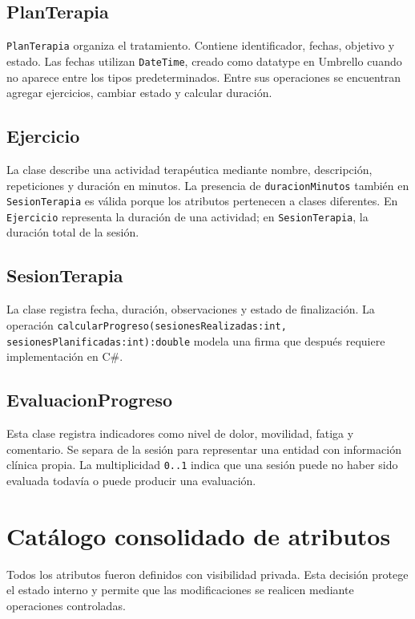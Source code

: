 \subsection{PlanTerapia}
\texttt{PlanTerapia} organiza el tratamiento. Contiene identificador, fechas, objetivo y estado. Las fechas utilizan \texttt{DateTime}, creado como datatype en Umbrello cuando no aparece entre los tipos predeterminados. Entre sus operaciones se encuentran agregar ejercicios, cambiar estado y calcular duración.

\subsection{Ejercicio}
La clase describe una actividad terapéutica mediante nombre, descripción, repeticiones y duración en minutos. La presencia de \texttt{duracionMinutos} también en \texttt{SesionTerapia} es válida porque los atributos pertenecen a clases diferentes. En \texttt{Ejercicio} representa la duración de una actividad; en \texttt{SesionTerapia}, la duración total de la sesión.

\subsection{SesionTerapia}
La clase registra fecha, duración, observaciones y estado de finalización. La operación \texttt{calcularProgreso(sesionesRealizadas:int, sesionesPlanificadas:int):double} modela una firma que después requiere implementación en C\#.

\subsection{EvaluacionProgreso}
Esta clase registra indicadores como nivel de dolor, movilidad, fatiga y comentario. Se separa de la sesión para representar una entidad con información clínica propia. La multiplicidad \texttt{0..1} indica que una sesión puede no haber sido evaluada todavía o puede producir una evaluación.

\section{Catálogo consolidado de atributos}
Todos los atributos fueron definidos con visibilidad privada. Esta decisión protege el estado interno y permite que las modificaciones se realicen mediante operaciones controladas.

